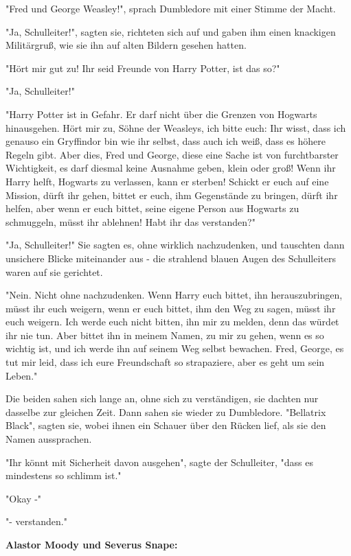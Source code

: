{"Fred und George Weasley!", sprach Dumbledore mit einer Stimme der Macht.

"Ja, Schulleiter!", sagten sie, richteten sich auf und gaben ihm einen knackigen Militärgruß, wie sie ihn auf alten Bildern gesehen hatten.

"Hört mir gut zu! Ihr seid Freunde von Harry Potter, ist das so?"

"Ja, Schulleiter!"

"Harry Potter ist in Gefahr. Er darf nicht über die Grenzen von Hogwarts hinausgehen. Hört mir zu, Söhne der Weasleys, ich bitte euch: Ihr wisst, dass ich genauso ein Gryffindor bin wie ihr selbst, dass auch ich weiß, dass es höhere Regeln gibt. Aber dies, Fred und George, diese eine Sache ist von furchtbarster Wichtigkeit, es darf diesmal keine Ausnahme geben, klein oder groß! Wenn ihr Harry helft, Hogwarts zu verlassen, kann er sterben! Schickt er euch auf eine Mission, dürft ihr gehen, bittet er euch, ihm Gegenstände zu bringen, dürft ihr helfen, aber wenn er euch bittet, seine eigene Person aus Hogwarts zu schmuggeln, müsst ihr ablehnen! Habt ihr das verstanden?"

"Ja, Schulleiter!" Sie sagten es, ohne wirklich nachzudenken, und tauschten dann unsichere Blicke miteinander aus - die strahlend blauen Augen des Schulleiters waren auf sie gerichtet.

"Nein. Nicht ohne nachzudenken. Wenn Harry euch bittet, ihn herauszubringen, müsst ihr euch weigern, wenn er euch bittet, ihm den Weg zu sagen, müsst ihr euch weigern. Ich werde euch nicht bitten, ihn mir zu melden, denn das würdet ihr nie tun. Aber bittet ihn in meinem Namen, zu mir zu gehen, wenn es so wichtig ist, und ich werde ihn auf seinem Weg selbst bewachen. Fred, George, es tut mir leid, dass ich eure Freundschaft so strapaziere, aber es geht um sein Leben."

Die beiden sahen sich lange an, ohne sich zu verständigen, sie dachten nur dasselbe zur gleichen Zeit. Dann sahen sie wieder zu Dumbledore. "Bellatrix Black", sagten sie, wobei ihnen ein Schauer über den Rücken lief, als sie den Namen aussprachen.

"Ihr könnt mit Sicherheit davon ausgehen", sagte der Schulleiter, "dass es mindestens so schlimm ist."

"Okay -"

"- verstanden."

\textbf{Alastor Moody und Severus Snape:}

}
